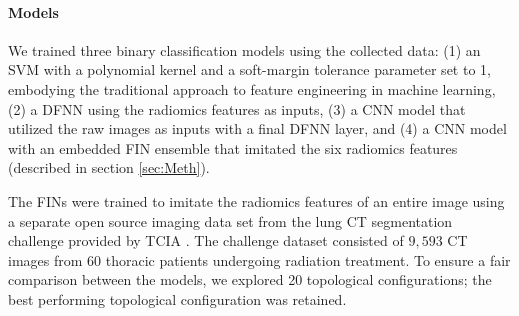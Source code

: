 \documentclass[conference]{IEEEtran}
\begin{document}
\begin{table}[t!]
\centering
\small
\caption{Mean and standard deviation of F-1 scores and accuracy, as well as the number of epochs until converge of each model by repeating the experiment \ref{sec:Exp2}, and compare the results of our proposed approach (row 3) against the two baseline approaches.}
\label{table:exp2}
\end{table}

\paragraph*{Models} We trained three binary classification models using the collected data: (1) an SVM with a polynomial kernel and a soft-margin tolerance parameter set to 1, embodying the traditional approach to feature engineering in machine learning, (2) a DFNN using the radiomics features as inputs, (3) a CNN model that utilized the raw images as inputs with a final DFNN layer, and (4) a CNN model with an embedded FIN ensemble that imitated the six radiomics features (described in section \ref{sec:Meth}).

The FINs were trained to imitate the radiomics features of an entire image using a separate open source imaging data set from the lung CT segmentation challenge \cite{lungCT} provided by TCIA \cite{clark2013cancer}. The challenge dataset consisted of $9,593$ CT images from $60$ thoracic patients undergoing radiation treatment. To ensure a fair comparison between the models, we explored 20 topological configurations; the best performing topological configuration was retained.  
\end{document}
